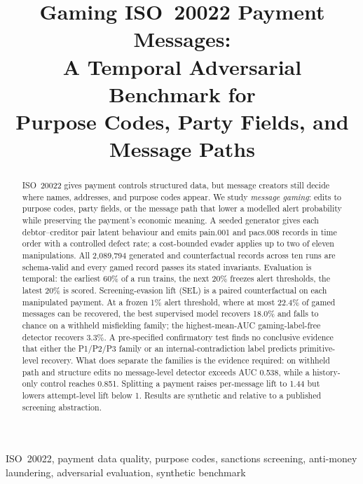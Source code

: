 \documentclass[conference]{IEEEtran}
\newif\ifanonymous
\begin{document}
\title{Gaming ISO~20022 Payment Messages:\\
A Temporal Adversarial Benchmark for\\
Purpose Codes, Party Fields, and Message Paths}
\ifanonymous
\author{\IEEEauthorblockN{Author names withheld for double-blind review}
\IEEEauthorblockA{Affiliations withheld for double-blind review}}
\else
\author{
}
\fi
\maketitle
\begin{abstract}
ISO~20022 gives payment controls structured data, but message creators still
decide where names, addresses, and purpose codes appear. We study
\emph{message gaming}: edits to purpose codes, party fields, or the message
path that lower a modelled alert probability while preserving the payment's
economic meaning. A seeded generator gives each debtor--creditor pair latent
behaviour and emits pain.001 and pacs.008 records in time order with a
controlled defect rate; a cost-bounded evader applies up to two of eleven
manipulations. All 2{,}089{,}794 generated and counterfactual
records across ten runs are schema-valid and every gamed record passes its
stated invariants. Evaluation is temporal: the earliest 60\% of a run trains, the
next 20\% freezes alert thresholds, the latest 20\% is scored. Screening-evasion lift (SEL) is a paired
counterfactual on each manipulated payment. At a frozen 1\% alert threshold,
where at most 22.4\% of gamed messages can be recovered, the best
supervised model recovers 18.0\% and falls to chance on a withheld
misfielding family; the highest-mean-AUC gaming-label-free detector
recovers 3.3\%. A pre-specified confirmatory test finds no conclusive
evidence that either the P1/P2/P3 family or an internal-contradiction label
predicts primitive-level recovery. What does separate the families is the
evidence required: on withheld path and structure edits no message-level
detector exceeds AUC 0.538, while a history-only control reaches
0.851. Splitting a payment raises per-message lift to 1.44 but
lowers attempt-level lift below 1. Results are synthetic and relative to
a published screening abstraction.
\end{abstract}
\begin{IEEEkeywords}
ISO~20022, payment data quality, purpose codes, sanctions screening,
anti-money laundering, adversarial evaluation, synthetic benchmark
\end{IEEEkeywords}
\end{document}
